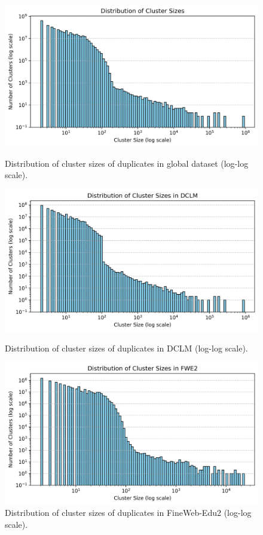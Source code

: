 \documentclass[conference]{IEEEtran}
\begin{document}
\onecolumn
\begin{figure}[h]
    \centering
    \begin{minipage}{.32\textwidth}
        \centering
        \includegraphics[width=\textwidth]{figures/distr_clusters_overall.png}
        \caption{Distribution of cluster sizes of duplicates in global dataset (log-log scale).}
        \label{fig:distr_clusters_overall}
    \end{minipage}\hfill
    \begin{minipage}{.32\textwidth}
        \centering
        \includegraphics[width=\textwidth]{figures/distr_clusters_dclm.png}
        \caption{Distribution of cluster sizes of duplicates in DCLM (log-log scale).}
        \label{fig:distr_clusters_dclm}
    \end{minipage}\hfill
    \begin{minipage}{.32\textwidth}
        \centering
        \includegraphics[width=\textwidth]{figures/distr_clusters_fwe2.png}
        \caption{Distribution of cluster sizes of duplicates in FineWeb-Edu2 (log-log scale).}
        \label{fig:distr_clusters_fwe2}
    \end{minipage}
\end{figure}
\end{document}

